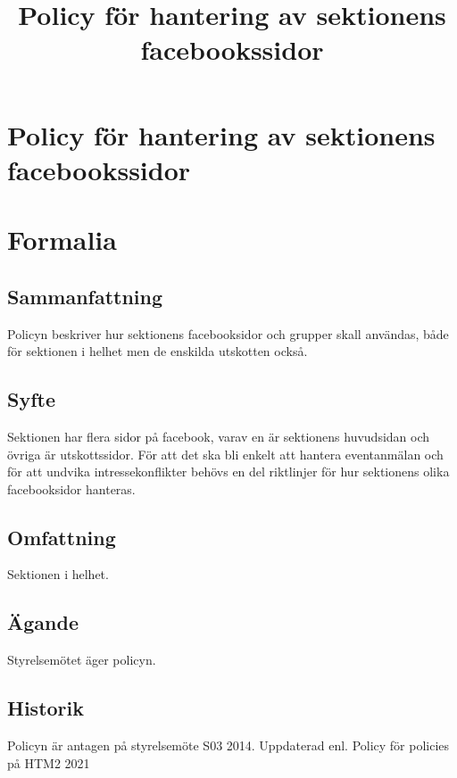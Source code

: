 \documentclass{dsekprotokoll}
\title{Policy för hantering av sektionens facebookssidor}
\author{}
\begin{document}
\section*{Policy för hantering av sektionens facebookssidor}
\section{Formalia}
\subsection{Sammanfattning}
Policyn beskriver hur sektionens facebooksidor och grupper skall användas, både för sektionen i helhet men de enskilda utskotten också.
\subsection{Syfte}
Sektionen har flera sidor på facebook, varav en är sektionens huvudsidan och övriga är utskottssidor. För att det ska bli enkelt att hantera eventanmälan och för att undvika intressekonflikter behövs en del riktlinjer för hur sektionens olika facebooksidor hanteras.
\subsection{Omfattning}
Sektionen i helhet.
\subsection{Ägande}
Styrelsemötet äger policyn.
\subsection{Historik}
Policyn är antagen på styrelsemöte S03 2014.
Uppdaterad enl. Policy för policies på HTM2 2021
\end{document}
